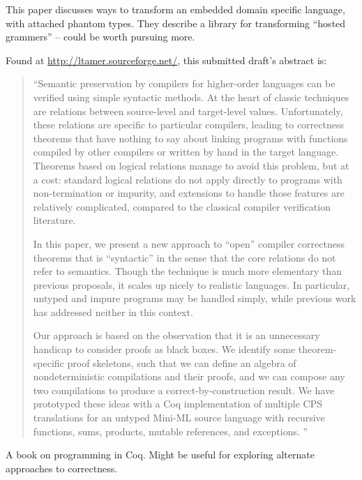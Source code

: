 \documentclass[11pt]{article}
\begin{document}
This paper discusses ways to transform an embedded domain specific
language, with attached phantom types. They describe a library for
transforming ``hosted grammers'' -- could be worth pursuing more.


Found at \url{http://ltamer.sourceforge.net/}, this submitted draft's abstract is:

\begin{quote}
``Semantic preservation by compilers for higher-order languages can be
  veriﬁed using simple syntactic methods. At the heart of classic
  techniques are relations between source-level and target-level
  values. Unfortunately, these relations are speciﬁc to particular
  compilers, leading to correctness theorems that have nothing to say
  about linking programs with functions compiled by other compilers or
  written by hand in the target language. Theorems based on logical
  relations manage to avoid this problem, but at a cost: standard
  logical relations do not apply directly to programs with
  non-termination or impurity, and extensions to handle those features
  are relatively complicated, compared to the classical compiler
  veriﬁcation literature.

  In this paper, we present a new approach to ``open'' compiler
  correctness theorems that is ``syntactic'' in the sense that the
  core relations do not refer to semantics. Though the technique is
  much more elementary than previous proposals, it scales up nicely
  to realistic languages. In particular, untyped and impure programs
  may be handled simply, while previous work has addressed neither
  in this context.
  
  Our approach is based on the observation that it is an unnecessary
  handicap to consider proofs as black boxes. We identify some
  theorem-speciﬁc proof skeletons, such that we can deﬁne an algebra
  of nondeterministic compilations and their proofs, and we can
  compose any two compilations to produce a correct-by-construction
  result. We have prototyped these ideas with a Coq implementation
  of multiple CPS translations for an untyped Mini-ML source
  language with recursive functions, sums, products, mutable
  references, and exceptions. ''
\end{quote}


A book on programming in Coq. Might be useful for exploring alternate
approaches to correctness.
\end{document}
